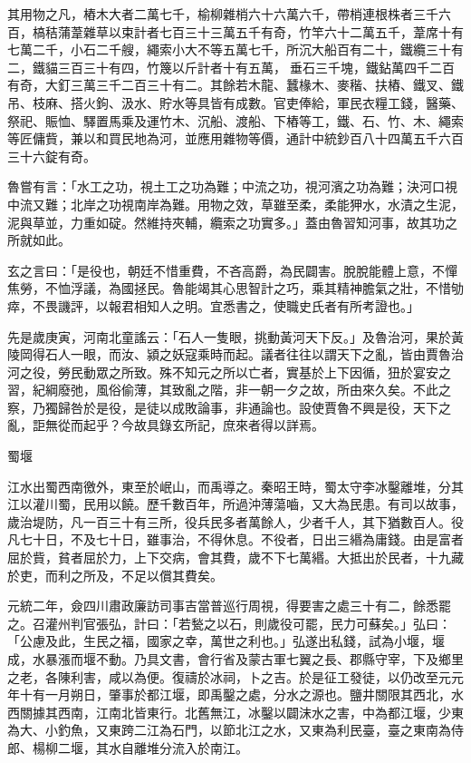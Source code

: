 \begin{pinyinscope}
 其用物之凡，樁木大者二萬七千，榆柳雜梢六十六萬六千，帶梢連根株者三千六百，槁秸蒲葦雜草以束計者七百三十三萬五千有奇，竹竿六十二萬五千，葦席十有七萬二千，小石二千艘，繩索小大不等五萬七千，所沉大船百有二十，鐵纜三十有二，鐵貓三百三十有四，竹篾以斤計者十有五萬，垂石三千塊，鐵鉆萬四千二百有奇，大釘三萬三千二百三十有二。其餘若木龍、蠶椽木、麥稭、扶樁、鐵叉、鐵吊、枝麻、搭火鉤、汲水、貯水等具皆有成數。官吏俸給，軍民衣糧工錢，醫藥、祭祀、賑恤、驛置馬乘及運竹木、沉船、渡船、下樁等工，鐵、石、竹、木、繩索等匠傭貲，兼以和買民地為河，並應用雜物等價，通計中統鈔百八十四萬五千六百三十六錠有奇。



 魯嘗有言：「水工之功，視土工之功為難；中流之功，視河濱之功為難；決河口視中流又難；北岸之功視南岸為難。用物之效，草雖至柔，柔能狎水，水漬之生泥，泥與草並，力重如碇。然維持夾輔，纜索之功實多。」蓋由魯習知河事，故其功之所就如此。



 玄之言曰：「是役也，朝廷不惜重費，不吝高爵，為民闢害。脫脫能體上意，不憚焦勞，不恤浮議，為國拯民。魯能竭其心思智計之巧，乘其精神膽氣之壯，不惜劬瘁，不畏譏評，以報君相知人之明。宜悉書之，使職史氏者有所考證也。」



 先是歲庚寅，河南北童謠云：「石人一隻眼，挑動黃河天下反。」及魯治河，果於黃陵岡得石人一眼，而汝、潁之妖寇乘時而起。議者往往以謂天下之亂，皆由賈魯治河之役，勞民動眾之所致。殊不知元之所以亡者，實基於上下因循，狃於宴安之習，紀綱廢弛，風俗偷薄，其致亂之階，非一朝一夕之故，所由來久矣。不此之察，乃獨歸咎於是役，是徒以成敗論事，非通論也。設使賈魯不興是役，天下之亂，詎無從而起乎？今故具錄玄所記，庶來者得以詳焉。



 蜀堰



 江水出蜀西南徼外，東至於岷山，而禹導之。秦昭王時，蜀太守李冰鑿離堆，分其江以灌川蜀，民用以饒。歷千數百年，所過沖薄蕩嚙，又大為民患。有司以故事，歲治堤防，凡一百三十有三所，役兵民多者萬餘人，少者千人，其下猶數百人。役凡七十日，不及七十日，雖事治，不得休息。不役者，日出三緡為庸錢。由是富者屈於貲，貧者屈於力，上下交病，會其費，歲不下七萬緡。大抵出於民者，十九藏於吏，而利之所及，不足以償其費矣。



 元統二年，僉四川肅政廉訪司事吉當普巡行周視，得要害之處三十有二，餘悉罷之。召灌州判官張弘，計曰：「若甃之以石，則歲役可罷，民力可蘇矣。」弘曰：「公慮及此，生民之福，國家之幸，萬世之利也。」弘遂出私錢，試為小堰，堰成，水暴漲而堰不動。乃具文書，會行省及蒙古軍七翼之長、郡縣守宰，下及鄉里之老，各陳利害，咸以為便。復禱於冰祠，卜之吉。於是征工發徒，以仍改至元元年十有一月朔日，肇事於都江堰，即禹鑿之處，分水之源也。鹽井關限其西北，水西關據其西南，江南北皆東行。北舊無江，冰鑿以闢沫水之害，中為都江堰，少東為大、小釣魚，又東跨二江為石門，以節北江之水，又東為利民臺，臺之東南為侍郎、楊柳二堰，其水自離堆分流入於南江。




\end{pinyinscope}
